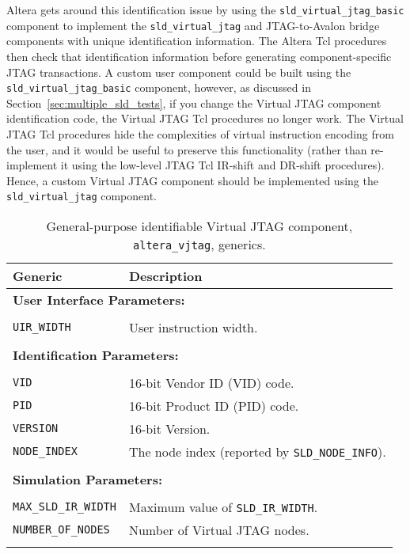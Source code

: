 \documentclass[10pt,twoside]{article}
\begin{document}
Altera gets around this identification issue by using the
\verb+sld_virtual_jtag_basic+ component to implement the
\verb+sld_virtual_jtag+ and JTAG-to-Avalon bridge components with
unique identification information. The Altera Tcl procedures
then check that identification information before generating
component-specific JTAG transactions. A custom user component
could be built using the \verb+sld_virtual_jtag_basic+ component,
however, as discussed in Section~\ref{sec:multiple_sld_tests},
if you change the  Virtual JTAG component identification code, 
the Virtual JTAG Tcl procedures no longer work. The Virtual
JTAG Tcl procedures hide the complexities of virtual instruction 
encoding from the user, and it would be useful to preserve this 
functionality (rather than re-implement it using the low-level JTAG
Tcl IR-shift and DR-shift procedures). Hence, a custom 
Virtual JTAG component should be implemented using
the \verb+sld_virtual_jtag+ component.

%
\begin{table}[t]
\caption{General-purpose identifiable Virtual JTAG component, {\tt altera\_vjtag}, generics.}
\label{fig:altera_vjtag_generics}
\begin{center}
\begin{tabular}{|l|p{8cm}|}
\hline
Generic & Description\\
\hline\hline
\multicolumn{2}{|l|}{\bf User Interface Parameters:}\\
\hline
&\\
\verb+UIR_WIDTH+  & User instruction width.\\
&\\
\hline
\multicolumn{2}{|l|}{\bf Identification Parameters:}\\
\hline
&\\
\verb+VID+           & 16-bit Vendor ID (VID) code.\\
\verb+PID+           & 16-bit Product ID (PID) code.\\
\verb+VERSION+       & 16-bit Version.\\
\verb+NODE_INDEX+    & The node index (reported by \verb+SLD_NODE_INFO+).\\
&\\
\hline
\multicolumn{2}{|l|}{\bf Simulation Parameters:}\\
\hline
&\\
\verb+MAX_SLD_IR_WIDTH+ & Maximum value of \verb+SLD_IR_WIDTH+.\\
\verb+NUMBER_OF_NODES+  & Number of Virtual JTAG nodes.\\
&\\
\hline
\end{tabular}
\end{center}
\end{table}
\end{document}
